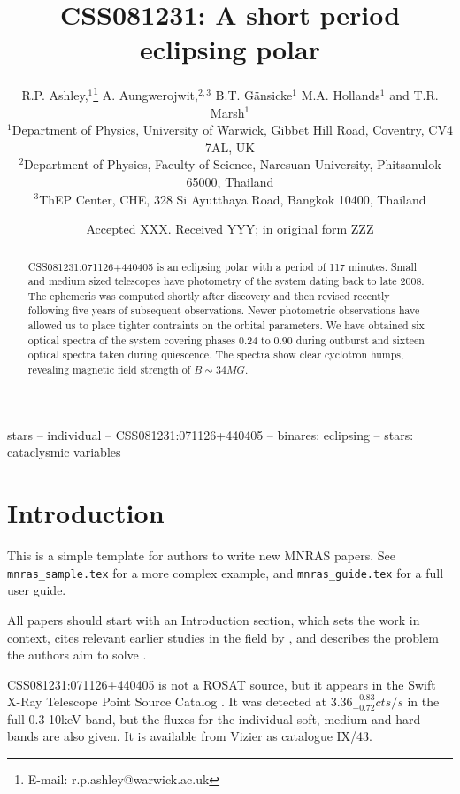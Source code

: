 \documentclass[a4paper,fleqn,usenatbib]{mnras}
\title[CSS081231]{CSS081231: A short period eclipsing polar}
\author[R.P. Ashley et al.]{
R.P. Ashley,$^{1}$\thanks{E-mail: r.p.ashley@warwick.ac.uk}
A. Aungwerojwit,$^{2, 3}$
B.T. G{\"a}nsicke$^{1}$
M.A. Hollands$^{1}$
and T.R. Marsh$^{1}$
\\
$^{1}$Department of Physics, University of Warwick, Gibbet Hill Road, Coventry, CV4 7AL, UK\\
$^{2}$Department of Physics, Faculty of Science, Naresuan University, Phitsanulok 65000, Thailand\\
$^{3}$ThEP Center, CHE, 328 Si Ayutthaya Road, Bangkok 10400, Thailand
}
\date{Accepted XXX. Received YYY; in original form ZZZ}
\begin{document}
\label{firstpage}
\pagerange{\pageref{firstpage}--\pageref{lastpage}}
\maketitle

\begin{abstract}
CSS081231:071126+440405 is an eclipsing polar with a period of 117 minutes. Small and medium sized telescopes have photometry of the system dating back to late 2008. The ephemeris was computed shortly after discovery and then revised recently following five years of subsequent observations. Newer photometric observations have allowed us to place tighter contraints on the orbital parameters. We have obtained six optical spectra of the system covering phases 0.24 to 0.90 during outburst and sixteen optical spectra taken during quiescence. The spectra show clear cyclotron humps, revealing magnetic field strength of $B  \sim 34 MG$.
\end{abstract}

\begin{keywords}
stars -- individual -- CSS081231:071126+440405 -- binares: eclipsing -- stars: cataclysmic variables
\end{keywords}



\section{Introduction}

This is a simple template for authors to write new MNRAS papers.
See \texttt{mnras\_sample.tex} for a more complex example, and \texttt{mnras\_guide.tex}
for a full user guide.

All papers should start with an Introduction section, which sets the work
in context, cites relevant earlier studies in the field by \citet{Others2013},
and describes the problem the authors aim to solve \citep[e.g.][]{Author2012}.

CSS081231:071126+440405 is not a ROSAT source, but it appears in the Swift X-Ray Telescope Point Source Catalog \citep{2014ApJS..210....8E}. It was detected at $3.36 ^{+0.83} _{-0.72} cts/s$ in the full 0.3-10keV band, but the fluxes for the individual soft, medium and hard bands are also given. It is available from Vizier as catalogue IX/43.
\end{document}
